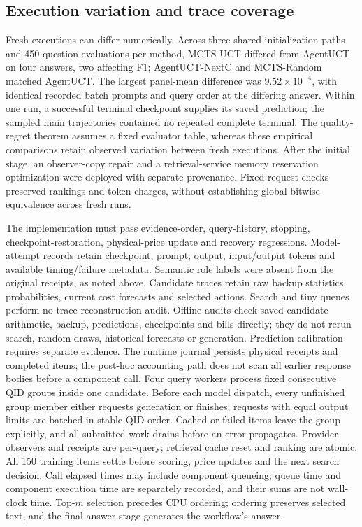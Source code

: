 \subsection{Execution variation and trace coverage}
Fresh executions can differ numerically. Across three shared initialization
paths and 450 question evaluations per method, MCTS-UCT differed from AgentUCT on
four answers, two affecting F1; AgentUCT-NextC and MCTS-Random matched AgentUCT.
The largest panel-mean difference was $9.52\times10^{-4}$, with identical
recorded batch prompts and query order at the differing answer. Within one
run, a successful terminal checkpoint supplies its saved prediction; the
sampled main trajectories contained no repeated complete terminal.
The quality-regret theorem assumes a fixed evaluator table, whereas these
empirical comparisons retain observed variation between fresh executions.
After the initial stage, an observer-copy repair and a retrieval-service
memory reservation optimization were deployed with separate provenance.
Fixed-request checks preserved rankings and token charges, without establishing
global bitwise equivalence across fresh runs.

The implementation must pass evidence-order, query-history, stopping,
checkpoint-restoration, physical-price update and recovery regressions.
Model-attempt records retain checkpoint, prompt, output, input/output
tokens and available timing/failure metadata. Semantic role labels were absent
from the original receipts, as noted above. Candidate traces retain raw backup statistics,
probabilities, current cost forecasts and selected actions. Search and tiny
queues perform no trace-reconstruction audit. Offline audits check saved
candidate arithmetic, backup, predictions, checkpoints and bills directly;
they do not rerun search, random draws, historical forecasts or generation.
Prediction calibration requires separate evidence. The runtime journal persists
physical receipts and completed items; the post-hoc accounting path does not
scan all earlier response bodies before a component call. Four query workers
process fixed consecutive QID groups inside one candidate. Before each model
dispatch, every unfinished group member either requests generation or finishes;
requests with equal output limits are batched in stable QID order. Cached or
failed items leave the group explicitly, and all submitted work drains before
an error propagates. Provider observers and receipts are per-query; retrieval
cache reset and ranking are atomic. All 150 training items settle before
scoring, price updates and the next search decision.
Call elapsed times may include component queueing; queue time and component
execution time are separately recorded, and their sums are not wall-clock time. Top-$m$ selection precedes
CPU ordering; ordering preserves selected text, and the final answer stage
generates the workflow's answer.

